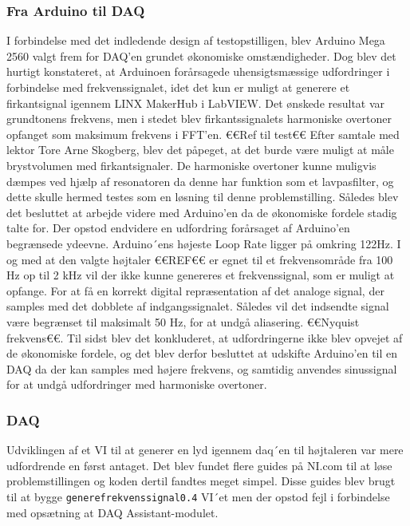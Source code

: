\subsubsection{Fra Arduino til DAQ}

I forbindelse med det indledende design af testopstilligen, blev Arduino Mega 2560 valgt frem for DAQ'en grundet økonomiske omstændigheder. Dog blev det hurtigt konstateret, at Arduinoen forårsagede uhensigtsmæssige udfordringer i forbindelse med frekvenssignalet, idet det kun er muligt at generere et firkantsignal igennem LINX MakerHub i LabVIEW. Det ønskede resultat var grundtonens frekvens, men i stedet blev firkantssignalets harmoniske overtoner opfanget som maksimum frekvens i  FFT'en. €€Ref til test€€ Efter samtale med lektor Tore Arne Skogberg, blev det påpeget, at det burde være muligt at måle brystvolumen med firkantsignaler. De harmoniske overtoner kunne muligvis dæmpes ved hjælp af resonatoren da denne har funktion som et lavpasfilter, og dette skulle hermed testes som en løsning til denne problemstilling. Således blev det besluttet at arbejde videre med Arduino'en da de økonomiske fordele stadig talte for. Der opstod endvidere en udfordring forårsaget af Arduino'en begrænsede ydeevne. Arduino´ens højeste Loop Rate ligger på omkring 122Hz. I og med at den valgte højtaler €€REF€€ er egnet til et frekvensområde fra 100 Hz op til 2 kHz vil der ikke kunne genereres et frekvenssignal, som er muligt at opfange. For at få en korrekt digital repræsentation af det analoge signal, der samples med det dobblete af indgangssignalet. Således vil det indsendte signal være begrænset til maksimalt 50 Hz, for at undgå aliasering. €€Nyquist frekvens€€. Til sidst blev det konkluderet, at udfordringerne ikke blev opvejet af de økonomiske fordele, og det blev derfor besluttet at udskifte Arduino'en til en DAQ da der kan samples med højere frekvens, og samtidig anvendes sinussignal for at undgå udfordringer med harmoniske overtoner.      

\subsubsection{DAQ}

Udviklingen af et VI til at generer en lyd igennem daq´en til højtaleren var mere udfordrende en først antaget. Det blev fundet flere guides på NI.com til at løse problemstillingen og koden dertil fandtes meget simpel. Disse guides blev brugt til at bygge \texttt{generefrekvenssignal0.4} VI´et men der opstod fejl i forbindelse med opsætning at DAQ Assistant-modulet. 

